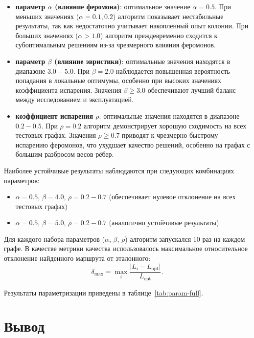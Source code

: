 \begin{itemize}
    \item \textbf{параметр \(\alpha\) (влияние феромона)}: оптимальное значение \(\alpha = 0.5\). При меньших значениях (\(\alpha = 0.1, 0.2\)) алгоритм показывает нестабильные результаты, так как недостаточно учитывает накопленный опыт колонии. При больших значениях (\(\alpha > 1.0\)) алгоритм преждевременно сходится к субоптимальным решениям из-за чрезмерного влияния феромонов.
    
    \item \textbf{параметр \(\beta\) (влияние эвристики)}: оптимальные значения находятся в диапазоне \(3.0-5.0\). При \(\beta = 2.0\) наблюдается повышенная вероятность попадания в локальные оптимумы, особенно при высоких значениях коэффициента испарения. Значения \(\beta \geqslant 3.0\) обеспечивают лучший баланс между исследованием и эксплуатацией.
    
    \item \textbf{коэффициент испарения \(\rho\)}: оптимальные значения находятся в диапазоне \(0.2-0.5\). При \(\rho = 0.2\) алгоритм демонстрирует хорошую сходимость на всех тестовых графах. Значения \(\rho \geqslant 0.7\) приводят к чрезмерно быстрому испарению феромонов, что ухудшает качество решений, особенно на графах с большим разбросом весов рёбер.
\end{itemize}

Наиболее устойчивые результаты наблюдаются при следующих комбинациях параметров:
\begin{itemize}
    \item \(\alpha = 0.5\), \(\beta = 4.0\), \(\rho = 0.2-0.7\) (обеспечивает нулевое отклонение на всех тестовых графах)
    \item \(\alpha = 0.5\), \(\beta = 5.0\), \(\rho = 0.2-0.7\) (аналогично устойчивые результаты)
\end{itemize}



Для каждого набора параметров (\(\alpha\), \(\beta\), \(\rho\))
алгоритм запускался 10 раз на каждом графе.
В качестве метрики качества использовалось максимальное относительное отклонение
найденного маршрута от эталонного:
\[
\delta_{\max} = \max_i \frac{\lvert L_i - L_{\text{opt}} \rvert}{L_{\text{opt}}}.
\]

Результаты параметризации приведены в таблице~\ref{tab:param-full}.



\section{Вывод}

